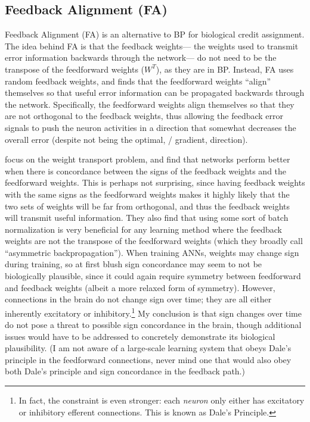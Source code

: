 \subsection{Feedback Alignment (FA)}

Feedback Alignment (FA) \parencite{Lillicrap2014}
is an alternative to BP for biological credit assignment.
The idea behind FA is that the feedback weights---%
the weights used to transmit error information backwards through the network---%
do not need to be the transpose of the feedforward weights ($W^T$),
as they are in BP.
Instead, FA uses random feedback weights,
and finds that the feedforward weights ``align'' themselves
so that useful error information can be propagated backwards through the network.
Specifically, the feedforward weights align themselves so that they are
not orthogonal to the feedback weights,
thus allowing the feedback error signals to push the neuron activities
in a direction that somewhat decreases the overall error
(despite not being the optimal, \ie/ gradient, direction).

\textcite{Liao2015} focus on the weight transport problem,
and find that networks perform better when there is concordance between
the signs of the feedback weights and the feedforward weights.
This is perhaps not surprising,
since having feedback weights with the same signs as the feedforward weights
makes it highly likely that the two sets of weights will be far from orthogonal,
and thus the feedback weights will transmit useful information.
They also find that using some sort of batch normalization \parencite{Ioffe2015}
is very beneficial for any learning method where the feedback weights
are not the transpose of the feedforward weights
(which they broadly call ``asymmetric backpropagation'').
When training ANNs, weights may change sign during training,
so at first blush sign concordance may seem to not be biologically plausible,
since it could again require symmetry between feedforward and feedback weights
(albeit a more relaxed form of symmetry).
However, connections in the brain do not change sign over time;
they are all either inherently excitatory or inhibitory.\footnote{
  In fact, the constraint is even stronger:
  each \emph{neuron} only either has excitatory or inhibitory efferent connections.
  This is known as Dale's Principle.}
My conclusion is that sign changes over time do not pose a threat to possible
sign concordance in the brain,
though additional issues would have to be addressed
to concretely demonstrate its biological plausibility.
(I am not aware of a large-scale learning system
that obeys Dale's principle in the feedforward connections,
never mind one that would also obey both Dale's principle and sign concordance
in the feedback path.)

